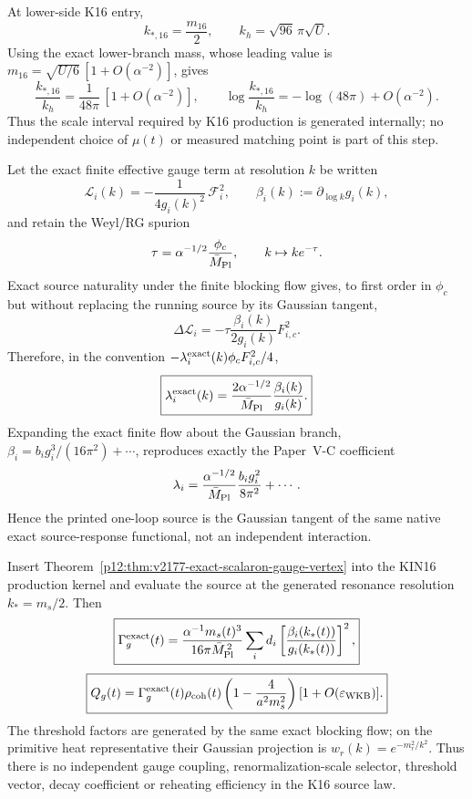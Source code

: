 \documentclass[12pt,a4paper]{article}
\begin{document}
\begin{corollary}
\label{p12:cor:v2177-k16-native-scale-interval}
At lower-side K16 entry,
\[
 k_{*,16}=\frac{m_{16}}2,
 \qquad
 k_h=\sqrt{96}\,\pi\sqrt U .
\]
Using the exact lower-branch mass, whose leading value is
$m_{16}=\sqrt{U/6}\,[1+O(\alpha^{-2})]$, gives
\[
 \boxed{\frac{k_{*,16}}{k_h}=\frac1{48\pi}\,[1+O(\alpha^{-2})]},
 \qquad
 \boxed{\log\frac{k_{*,16}}{k_h}=-\log(48\pi)+O(\alpha^{-2}).}
\]
Thus the scale interval required by K16 production is generated internally;
no independent choice of $\mu(t)$ or measured matching point is part of this
step.
\end{corollary}

\begin{theorem}
\label{p12:thm:v2177-exact-scalaron-gauge-vertex}
Let the exact finite effective gauge term at resolution $k$ be written
\[
 \mathcal L_i(k)=-\frac1{4g_i(k)^2}\,\mathcal F_i^2,
 \qquad
 \beta_i(k):=\partial_{\log k}g_i(k),
\]
and retain the Weyl/RG spurion
\[
 \tau=\alpha^{-1/2}\frac{\phi_c}{\bar M_{\rm Pl}},
 \qquad k\mapsto ke^{-\tau}.
\]
Exact source naturality under the finite blocking flow gives, to first order in
$\phi_c$ but without replacing the running source by its Gaussian tangent,
\[
 \Delta\mathcal L_i
 =-\tau\frac{\beta_i(k)}{2g_i(k)}F_{i,c}^2.
\]
Therefore, in the convention
$-\lambda_i^{\rm exact}(k)\phi_cF_{i,c}^2/4$,
\[
 \boxed{\lambda_i^{\rm exact}(k)
 =\frac{2\alpha^{-1/2}}{\bar M_{\rm Pl}}
 \frac{\beta_i(k)}{g_i(k)}.}
\]
Expanding the exact finite flow about the Gaussian branch,
$\beta_i=b_ig_i^3/(16\pi^2)+\cdots$, reproduces exactly the Paper~V-C
coefficient
\[
 \lambda_i=\frac{\alpha^{-1/2}}{\bar M_{\rm Pl}}
 \frac{b_i g_i^2}{8\pi^2}+\cdots .
\]
Hence the printed one-loop source is the Gaussian tangent of the same native
exact source-response functional, not an independent interaction.
\end{theorem}

\begin{corollary}
\label{p12:cor:v2177-exact-k16-gauge-pump}
Insert Theorem~\ref{p12:thm:v2177-exact-scalaron-gauge-vertex} into the KIN16
production kernel and evaluate the source at the generated resonance
resolution $k_*=m_s/2$.  Then
\[
 \boxed{
 \Gamma_g^{\rm exact}(t)=
 \frac{\alpha^{-1}m_s(t)^3}{16\pi\bar M_{\rm Pl}^{\,2}}
 \sum_i d_i
 \left[\frac{\beta_i(k_*(t))}{g_i(k_*(t))}\right]^2,}
\]
\[
 \boxed{
 Q_g(t)=\Gamma_g^{\rm exact}(t)\rho_{\rm coh}(t)
 \left(1-\frac4{a^2m_s^2}\right)
 [1+O(\varepsilon_{\rm WKB})].}
\]
The threshold factors are generated by the same exact blocking flow; on the
primitive heat representative their Gaussian projection is
$w_r(k)=e^{-m_r^2/k^2}$.  Thus there is no independent gauge coupling,
renormalization-scale selector, threshold vector, decay coefficient or
reheating efficiency in the K16 source law.
\end{corollary}
\end{document}
